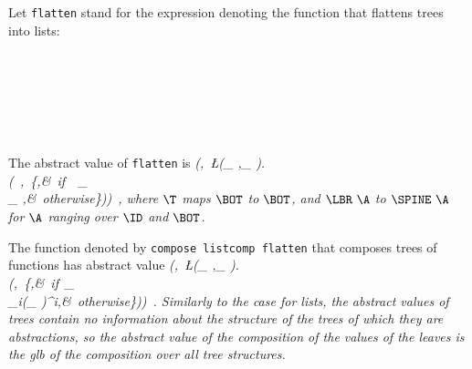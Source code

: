 Let \mbox{\tt flatten} stand for the expression denoting the function that flattens
trees into lists:
\begin{flushleft}
\vspace{-0.0em}\vspace{-0.0em}\\
\vspace{-0.0em}\\
\vspace{-0.0em}\\
\vspace{-0.0em}\\
\vspace{-0.0em}\\
\vspace{-0.0em}
\end{flushleft}
The abstract value of \mbox{\tt flatten} is
\beqs
\it (\ID,\ \L(\A_{ },\K_{ }).\\
\it (\T\ \A,\ \left\{\bot,&\it \mbox{\rm\ if}\ \T\ \A_{ }\neq\LBR\ \ID\\
\it \K_{ },&\it \mbox{\rm\ otherwise}\ea\right\}))\ ,
\eeqs
where $\T$ maps $\BOT$ to $\BOT$, and $\LBR~\A$ to $\SPINE~\A$ for $\A$
ranging over $\ID$ and $\BOT$.

The function denoted by \mbox{\tt compose\ listcomp\ flatten} that composes
trees of functions has abstract value
\beqs
\it (\ID,\ \L(\A_{ },\K_{ }).\\
\it (\ID,\ \left\{\bot,&\it \mbox{\rm\ if}\ \A_{ }\neq\LBR\ \ID\\
\it \glb_{i}(\K_{ })^i,&\it \mbox{\rm\ otherwise}\ea\right\}))\ .
\eeqs
Similarly to the case for lists, the abstract values of trees contain
no information about the structure of the trees of which they are abstractions,
so the abstract value of the composition of the values of the leaves
is the glb of the composition over all tree structures.

